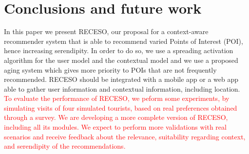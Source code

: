 \section{Conclusions and future work} \label{section:conclu}

In this paper we present RECESO, our proposal for a context-aware recommender system that is able to recommend varied Points of Interest (POI), hence increasing serendipity. In order to do so, we use a spreading activation algorithm for the user model and the contextual model and we use a proposed aging system which gives more priority to POIs that are not frequently recommended. RECESO should be integrated with a mobile app or a web app able to gather user information and contextual information, including location. \textcolor{red}{To evaluate the performance of RECESO, we peform some experiments, by simulating visits of four simulated tourists, based on real preferences obtained through a survey. We are developing a more complete version of RECESO, including all its modules. We expect to perform more validations with real scenarios and receive feedback about the relevance, suitability regarding context, and serendipity of the recommendations.}

